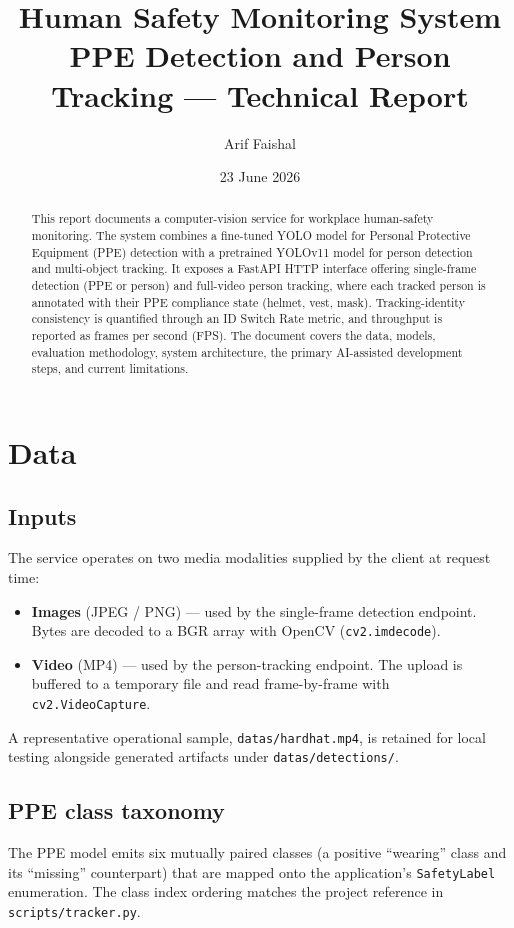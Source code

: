 \documentclass[11pt,a4paper]{article}
\title{\textbf{Human Safety Monitoring System}\\[2pt]
\large PPE Detection and Person Tracking --- Technical Report}
\author{Arif Faishal}
\date{23 June 2026}
\begin{document}
\maketitle

\begin{abstract}
\noindent
This report documents a computer-vision service for workplace human-safety
monitoring. The system combines a fine-tuned YOLO model for Personal
Protective Equipment (PPE) detection with a pretrained YOLOv11 model for
person detection and multi-object tracking. It exposes a FastAPI HTTP
interface offering single-frame detection (PPE or person) and full-video
person tracking, where each tracked person is annotated with their PPE
compliance state (helmet, vest, mask). Tracking-identity consistency is
quantified through an ID Switch Rate metric, and throughput is reported as
frames per second (FPS). The document covers the data, models, evaluation
methodology, system architecture, the primary AI-assisted development steps,
and current limitations.
\end{abstract}

\section{Data}

\subsection{Inputs}
The service operates on two media modalities supplied by the client at request
time:
\begin{itemize}
  \item \textbf{Images} (JPEG / PNG) --- used by the single-frame detection
        endpoint. Bytes are decoded to a BGR array with OpenCV
        (\verb|cv2.imdecode|).
  \item \textbf{Video} (MP4) --- used by the person-tracking endpoint. The
        upload is buffered to a temporary file and read frame-by-frame with
        \verb|cv2.VideoCapture|.
\end{itemize}
A representative operational sample, \verb|datas/hardhat.mp4|, is retained for
local testing alongside generated artifacts under \verb|datas/detections/|.

\subsection{PPE class taxonomy}
The PPE model emits six mutually paired classes (a positive ``wearing'' class
and its ``missing'' counterpart) that are mapped onto the application's
\verb|SafetyLabel| enumeration. The class index ordering matches the project
reference in \verb|scripts/tracker.py|.
\end{document}
